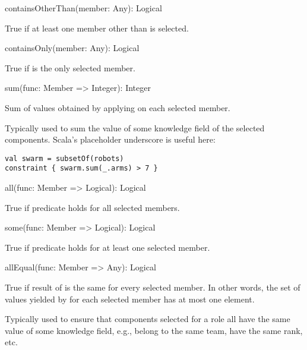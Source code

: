 \begin{dslsig}
containsOtherThan(member: Any): Logical
\end{dslsig}
\begin{dsldesc}
    True if at least one member other than  is selected.
\end{dsldesc}

\begin{dslsig}
containsOnly(member: Any): Logical
\end{dslsig}
\begin{dsldesc}
    True if  is the only selected member.
\end{dsldesc}

\begin{dslsig}
sum(func: Member => Integer): Integer
\end{dslsig}
\begin{dsldesc}
    Sum of values obtained by applying  on each selected member.

    Typically used to sum the value of some knowledge field of the selected components.
    Scala's placeholder underscore is useful here:

\begin{lstlisting}[style=snippet]
val swarm = subsetOf(robots)
constraint { swarm.sum(_.arms) > 7 }
\end{lstlisting}
\end{dsldesc}

\begin{dslsig}
all(func: Member => Logical): Logical
\end{dslsig}
\begin{dsldesc}
    True if predicate  holds for all selected members.
\end{dsldesc}

\begin{dslsig}
some(func: Member => Logical): Logical
\end{dslsig}
\begin{dsldesc}
    True if predicate  holds for at least one selected member.
\end{dsldesc}

\begin{dslsig}
allEqual(func: Member => Any): Logical
\end{dslsig}
\begin{dsldesc}
    True if result of  is the same for every selected member. In other
    words, the set of values yielded by  for each selected member has at most
    one element.

    Typically used to ensure that components selected for a role all have the same value
    of some knowledge field, e.g., belong to the same team, have the same rank, etc.
\end{dsldesc}

